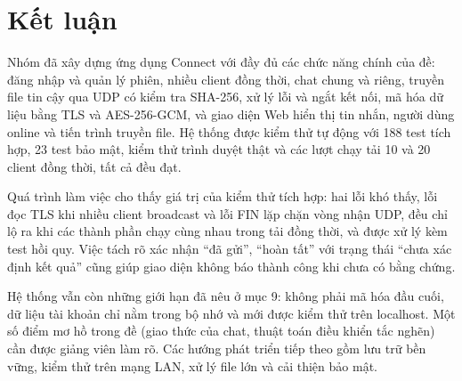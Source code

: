 \section{Kết luận}
Nhóm đã xây dựng ứng dụng Connect với đầy đủ các chức năng chính của đề: đăng nhập và quản lý phiên, nhiều client đồng thời, chat chung và riêng, truyền file tin cậy qua UDP có kiểm tra SHA-256, xử lý lỗi và ngắt kết nối, mã hóa dữ liệu bằng TLS và AES-256-GCM, và giao diện Web hiển thị tin nhắn, người dùng online và tiến trình truyền file. Hệ thống được kiểm thử tự động với 188 test tích hợp, 23 test bảo mật, kiểm thử trình duyệt thật và các lượt chạy tải 10 và 20 client đồng thời, tất cả đều đạt.

Quá trình làm việc cho thấy giá trị của kiểm thử tích hợp: hai lỗi khó thấy, lỗi đọc TLS khi nhiều client broadcast và lỗi FIN lặp chặn vòng nhận UDP, đều chỉ lộ ra khi các thành phần chạy cùng nhau trong tải đồng thời, và được xử lý kèm test hồi quy. Việc tách rõ xác nhận “đã gửi”, “hoàn tất” với trạng thái “chưa xác định kết quả” cũng giúp giao diện không báo thành công khi chưa có bằng chứng.

Hệ thống vẫn còn những giới hạn đã nêu ở mục 9: không phải mã hóa đầu cuối, dữ liệu tài khoản chỉ nằm trong bộ nhớ và mới được kiểm thử trên localhost. Một số điểm mơ hồ trong đề (giao thức của chat, thuật toán điều khiển tắc nghẽn) cần được giảng viên làm rõ. Các hướng phát triển tiếp theo gồm lưu trữ bền vững, kiểm thử trên mạng LAN, xử lý file lớn và cải thiện bảo mật.